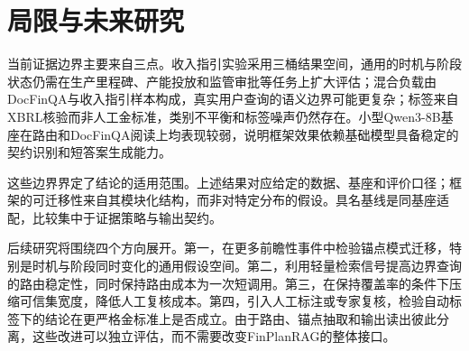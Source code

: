 

\section{局限与未来研究}

当前证据边界主要来自三点。收入指引实验采用三桶结果空间，通用的时机与阶段状态仍需在生产里程碑、产能投放和监管审批等任务上扩大评估；混合负载由DocFinQA与收入指引样本构成，真实用户查询的语义边界可能更复杂；标签来自XBRL核验而非人工金标准，类别不平衡和标签噪声仍然存在。小型Qwen3-8B基座在路由和DocFinQA阅读上均表现较弱，说明框架效果依赖基础模型具备稳定的契约识别和短答案生成能力。

这些边界界定了结论的适用范围。上述结果对应给定的数据、基座和评价口径；框架的可迁移性来自其模块化结构，而非对特定分布的假设。具名基线是同基座适配，比较集中于证据策略与输出契约。

后续研究将围绕四个方向展开。第一，在更多前瞻性事件中检验锚点模式迁移，特别是时机与阶段同时变化的通用假设空间。第二，利用轻量检索信号提高边界查询的路由稳定性，同时保持路由成本为一次短调用。第三，在保持覆盖率的条件下压缩可信集宽度，降低人工复核成本。第四，引入人工标注或专家复核，检验自动标签下的结论在更严格金标准上是否成立。由于路由、锚点抽取和输出读出彼此分离，这些改进可以独立评估，而不需要改变FinPlanRAG的整体接口。



\clearpage
{}
{}
{\setlength{\baselineskip}{16pt}}

\appendix

